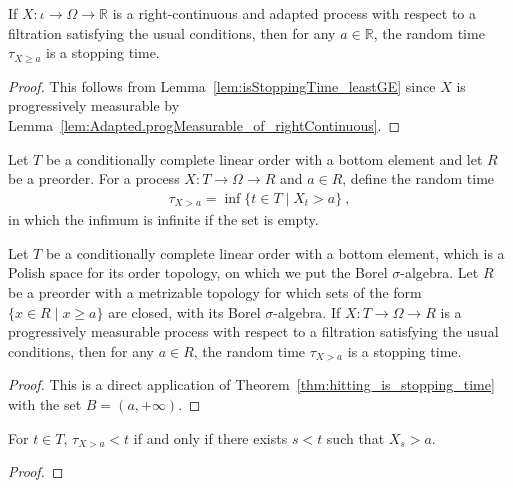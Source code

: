 \begin{corollary}\label{cor:isStoppingTime_leastGE_of_rightContinuous}
If $X : ι \to Ω \to ℝ$ is a right-continuous and adapted process with respect to a filtration satisfying the usual conditions, then for any $a \in \mathbb{R}$, the random time $\tau_{X \ge a}$ is a stopping time.
\end{corollary}

\begin{proof}
This follows from Lemma~\ref{lem:isStoppingTime_leastGE} since $X$ is progressively measurable by Lemma~\ref{lem:Adapted.progMeasurable_of_rightContinuous}.
\end{proof}


\begin{definition}\label{def:leastGT}
  \leanok
Let $T$ be a conditionally complete linear order with a bottom element and let $R$ be a preorder.
For a process $X : T \to Ω \to R$ and $a \in R$, define the random time
\begin{align*}
  \tau_{X > a} = \inf\{t \in T \mid X_t > a\} \: ,
\end{align*}
in which the infimum is infinite if the set is empty.
\end{definition}


\begin{lemma}\label{lem:isStoppingTime_leastGT}
  \leanok
Let $T$ be a conditionally complete linear order with a bottom element, which is a Polish space for its order topology, on which we put the Borel $\sigma$-algebra.
Let $R$ be a preorder with a metrizable topology for which sets of the form $\{x \in R \mid x \ge a\}$ are closed, with its Borel $\sigma$-algebra.
If $X : T \to Ω \to R$ is a progressively measurable process with respect to a filtration satisfying the usual conditions, then for any $a \in R$, the random time $\tau_{X > a}$ is a stopping time.
\end{lemma}

\begin{proof}\leanok
This is a direct application of Theorem~\ref{thm:hitting_is_stopping_time} with the set $B = (a, +\infty)$.
\end{proof}


\begin{lemma}\label{lem:leastGT_lt_iff}
  \leanok
For $t \in T$, $\tau_{X > a} < t$ if and only if there exists $s < t$ such that $X_s > a$.
\end{lemma}

\begin{proof}\leanok

\end{proof}
